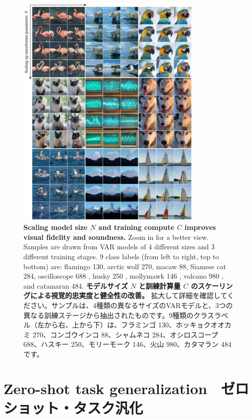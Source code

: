 \documentclass{article}
\begin{document}
\begin{figure}[t]
\begin{center}
  \includegraphics[width=0.8\textwidth]{2025_10_26_62f95e615e8879e267a8g-10}
\caption{\textbf{Scaling model size $N$ and training compute $C$ improves visual fidelity and soundness.}
Zoom in for a better view. Samples are drawn from VAR models of 4 different sizes and 3 different training stages. 9 class labels (from left to right, top to bottom) are: flamingo 130, arctic wolf 270, macaw 88, Siamese cat 284, oscilloscope 688 , husky 250 , mollymawk 146 , volcano 980 , and catamaran 484.
\textbf{モデルサイズ $N$ と訓練計算量 $C$ のスケーリングによる視覚的忠実度と健全性の改善。}
拡大して詳細を確認してください。サンプルは、4種類の異なるサイズのVARモデルと、3つの異なる訓練ステージから抽出されたものです。9種類のクラスラベル（左から右、上から下）は、フラミンゴ 130、ホッキョクオオカミ 270、コンゴウインコ 88、シャムネコ 284、オシロスコープ 688、ハスキー 250、モリーモーク 146、火山 980、カタマラン 484です。
}
\end{center}
\end{figure}

\section{Zero-shot task generalization　ゼロショット・タスク汎化}
\end{document}
